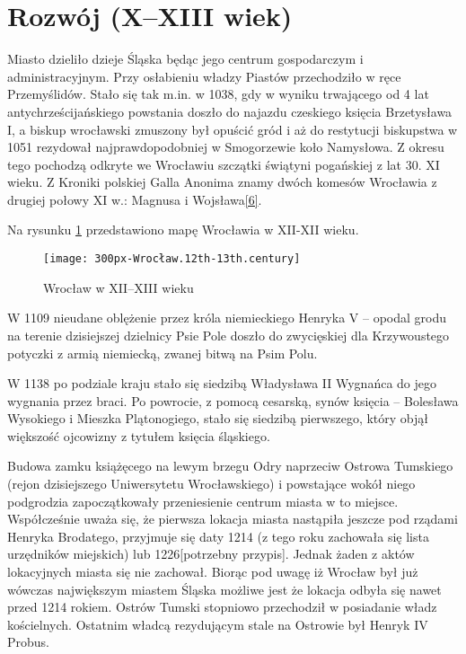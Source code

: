 \documentclass{article}
\begin{document}
\section*{Rozwój (X–XIII wiek)}
Miasto dzieliło dzieje Śląska będąc jego centrum gospodarczym i administracyjnym. Przy osłabieniu władzy Piastów przechodziło w ręce Przemyślidów. Stało się tak m.in. w 1038, gdy w wyniku trwającego od 4 lat antychrześcijańskiego powstania doszło do najazdu czeskiego księcia Brzetysława I, a biskup wrocławski zmuszony był opuścić gród i aż do restytucji biskupstwa w 1051 rezydował najprawdopodobniej w Smogorzewie koło Namysłowa. Z okresu tego pochodzą odkryte we Wrocławiu szczątki świątyni pogańskiej z lat 30. XI wieku. Z Kroniki polskiej Galla Anonima znamy dwóch komesów Wrocławia z drugiej połowy XI w.: Magnusa i Wojsława\hyperref[6]{[6]}\label{16}.

\vspace{6pt}

\noindent Na rysunku \ref{rysunek1} przedstawiono mapę Wrocławia w XII-XII wieku.

\begin{figure}[h]
\centering
\texttt{[image: 300px-Wrocław.12th-13th.century]}
\caption{Wrocław w XII–XIII wieku}
\label{rysunek1}
\end{figure}

\noindent W 1109 nieudane oblężenie przez króla niemieckiego Henryka V – opodal grodu na terenie dzisiejszej dzielnicy Psie Pole doszło do zwycięskiej dla Krzywoustego potyczki z armią niemiecką, zwanej bitwą na Psim Polu.

\vspace{6pt}

\noindent W 1138 po podziale kraju stało się siedzibą Władysława II Wygnańca do jego wygnania przez braci. Po powrocie, z pomocą cesarską, synów księcia – Bolesława Wysokiego i Mieszka Plątonogiego, stało się siedzibą pierwszego, który objął większość ojcowizny z tytułem księcia śląskiego.

\vspace{6pt}

\noindent Budowa zamku książęcego na lewym brzegu Odry naprzeciw Ostrowa Tumskiego (rejon dzisiejszego Uniwersytetu Wrocławskiego) i powstające wokół niego podgrodzia zapoczątkowały przeniesienie centrum miasta w to miejsce. Współcześnie uważa się, że pierwsza lokacja miasta nastąpiła jeszcze pod rządami Henryka Brodatego, przyjmuje się daty 1214 (z tego roku zachowała się lista urzędników miejskich) lub 1226[potrzebny przypis]. Jednak żaden z aktów lokacyjnych miasta się nie zachował. Biorąc pod uwagę iż Wrocław był już wówczas największym miastem Śląska możliwe jest że lokacja odbyła się nawet przed 1214 rokiem. Ostrów Tumski stopniowo przechodził w posiadanie władz kościelnych. Ostatnim władcą rezydującym stale na Ostrowie był Henryk IV Probus.
\end{document}
